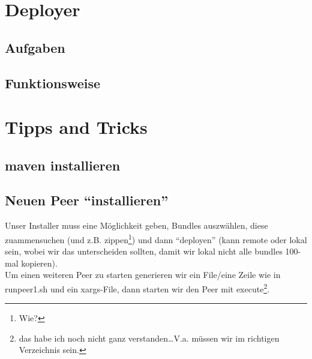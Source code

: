 \documentclass[10pt]{article}
\begin{document}
\section{Deployer}
\subsection{Aufgaben}
\subsection{Funktionsweise}

\section{Tipps and Tricks}

\subsection{maven installieren}

\subsection{Neuen Peer ``installieren''}
Unser Installer muss eine M\"oglichkeit geben, Bundles auszw\"ahlen, diese zuammensuchen (und z.B. zippen\footnote{Wie?}) und dann ``deployen'' (kann remote oder lokal sein, wobei wir das unterscheiden sollten, damit wir lokal nicht alle bundles 100-mal kopieren).\\
Um einen weiteren Peer zu starten generieren wir ein File/eine Zeile wie in runpeer1.sh und ein xargs-File, dann starten wir den Peer mit execute\footnote{das habe ich noch nicht ganz verstanden\ldots V.a. m\"ussen wir im richtigen Verzeichnis sein.}.
\end{document}
